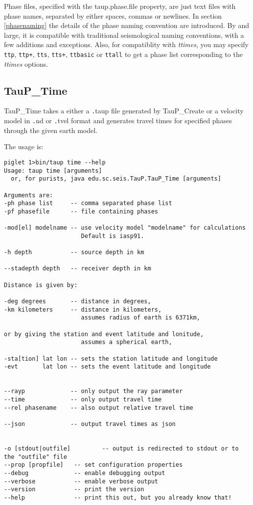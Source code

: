 Phase files, specified with the taup.phase.file property,
 are just text files with phase names, separated by either
spaces, commas or newlines. In section \ref{phasenaming} the details of
the phase naming convention are introduced.
By and large, it is compatible with traditional
seismological naming conventions, with a few additions and exceptions.
Also, for compatiblity with \textit{ttimes}, you may specify
\texttt{ttp}, \texttt{ttp+}, \texttt{tts}, \texttt{tts+},
\texttt{ttbasic} or \texttt{ttall} to get a phase list corresponding
to the \textit{ttimes} options.

\subsection{TauP\_Time}
TauP\_Time takes a either a {\texttt .taup} file generated by TauP\_Create or a velocity model in
{\texttt .nd} or {\texttt .tvel} format and generates
travel times for specified phases through the given earth model.

The usage is:
\begin{verbatim}
piglet 1>bin/taup time --help
Usage: taup time [arguments]
  or, for purists, java edu.sc.seis.TauP.TauP_Time [arguments]

Arguments are:
-ph phase list     -- comma separated phase list
-pf phasefile      -- file containing phases

-mod[el] modelname -- use velocity model "modelname" for calculations
                      Default is iasp91.

-h depth           -- source depth in km

--stadepth depth   -- receiver depth in km

Distance is given by:

-deg degrees       -- distance in degrees,
-km kilometers     -- distance in kilometers,
                      assumes radius of earth is 6371km,

or by giving the station and event latitude and lonitude,
                      assumes a spherical earth,

-sta[tion] lat lon -- sets the station latitude and longitude
-evt       lat lon -- sets the event latitude and longitude


--rayp             -- only output the ray parameter
--time             -- only output travel time
--rel phasename    -- also output relative travel time

--json             -- output travel times as json


-o [stdout|outfile]         -- output is redirected to stdout or to the "outfile" file
--prop [propfile]   -- set configuration properties
--debug             -- enable debugging output
--verbose           -- enable verbose output
--version           -- print the version
--help              -- print this out, but you already know that!
\end{verbatim}

